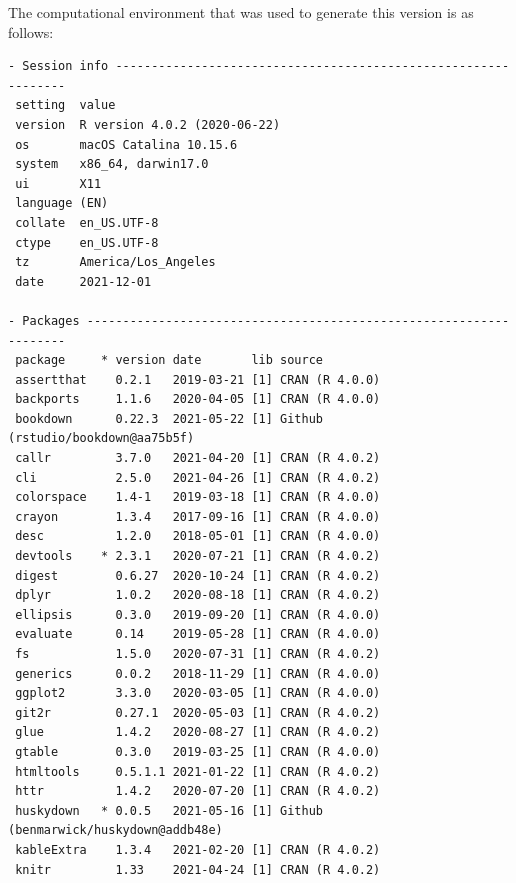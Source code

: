 \documentclass [11pt, proquest] {uwthesis}[2015/03/03]
\begin{document}
The computational environment that was used to generate this version is
as follows:
\begin{verbatim}
- Session info ---------------------------------------------------------------
 setting  value                       
 version  R version 4.0.2 (2020-06-22)
 os       macOS Catalina 10.15.6      
 system   x86_64, darwin17.0          
 ui       X11                         
 language (EN)                        
 collate  en_US.UTF-8                 
 ctype    en_US.UTF-8                 
 tz       America/Los_Angeles         
 date     2021-12-01                  

- Packages -------------------------------------------------------------------
 package     * version date       lib source                               
 assertthat    0.2.1   2019-03-21 [1] CRAN (R 4.0.0)                       
 backports     1.1.6   2020-04-05 [1] CRAN (R 4.0.0)                       
 bookdown      0.22.3  2021-05-22 [1] Github (rstudio/bookdown@aa75b5f)    
 callr         3.7.0   2021-04-20 [1] CRAN (R 4.0.2)                       
 cli           2.5.0   2021-04-26 [1] CRAN (R 4.0.2)                       
 colorspace    1.4-1   2019-03-18 [1] CRAN (R 4.0.0)                       
 crayon        1.3.4   2017-09-16 [1] CRAN (R 4.0.0)                       
 desc          1.2.0   2018-05-01 [1] CRAN (R 4.0.0)                       
 devtools    * 2.3.1   2020-07-21 [1] CRAN (R 4.0.2)                       
 digest        0.6.27  2020-10-24 [1] CRAN (R 4.0.2)                       
 dplyr         1.0.2   2020-08-18 [1] CRAN (R 4.0.2)                       
 ellipsis      0.3.0   2019-09-20 [1] CRAN (R 4.0.0)                       
 evaluate      0.14    2019-05-28 [1] CRAN (R 4.0.0)                       
 fs            1.5.0   2020-07-31 [1] CRAN (R 4.0.2)                       
 generics      0.0.2   2018-11-29 [1] CRAN (R 4.0.0)                       
 ggplot2       3.3.0   2020-03-05 [1] CRAN (R 4.0.0)                       
 git2r         0.27.1  2020-05-03 [1] CRAN (R 4.0.2)                       
 glue          1.4.2   2020-08-27 [1] CRAN (R 4.0.2)                       
 gtable        0.3.0   2019-03-25 [1] CRAN (R 4.0.0)                       
 htmltools     0.5.1.1 2021-01-22 [1] CRAN (R 4.0.2)                       
 httr          1.4.2   2020-07-20 [1] CRAN (R 4.0.2)                       
 huskydown   * 0.0.5   2021-05-16 [1] Github (benmarwick/huskydown@addb48e)
 kableExtra    1.3.4   2021-02-20 [1] CRAN (R 4.0.2)                       
 knitr         1.33    2021-04-24 [1] CRAN (R 4.0.2)                       

\end{verbatim}
\end{document}
